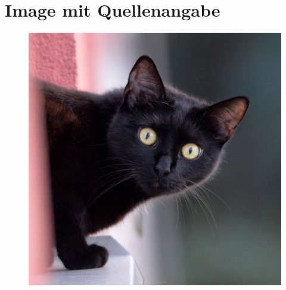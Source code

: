 \documentclass{scrarticle}
\begin{document}
	\section{Image mit Quellenangabe}
	\begin{figure}[h!hbt]
		\centering
		\includegraphics[width=\linewidth]{./Abbildungen/Beispiel.jpg}
	\end{figure}
\end{document}
